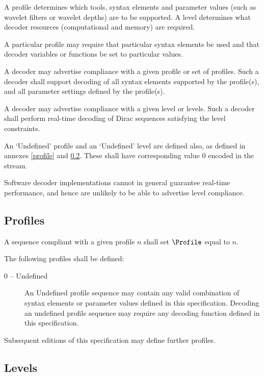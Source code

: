 \label{profilelevel}

A profile determines which tools, syntax elements and parameter values (such as wavelet 
 filters or wavelet depths) are to be 
supported. A level determines what decoder resources (computational and memory)
 are required. 

A particular profile may require that particular syntax elements be used and that decoder
variables or functions be set to particular values. 

A decoder may advertise compliance with a given profile or set of profiles. 
Such a decoder shall support decoding of all syntax elements supported by the profile(s),
 and all parameter settings defined by the profile(s).

A decoder may advertise compliance with a given level or levels. Such a decoder shall
perform real-time decoding of Dirac sequences satisfying the level constraints.

An `Undefined' profile and an `Undefined' level are defined also, as defined in annexes 
\ref{profile} and \ref{level}. These shall have corresponding value 0 encoded in the stream.

\begin{informative}
Software decoder implementations cannot in general guarantee real-time performance,
and hence are unlikely to be able to advertise level compliance.
\end{informative}

\subsection{Profiles}
\label{profiles}

A sequence compliant with a given profile $n$ shall set $\Profile$ equal to $n$.

The following profiles shall be defined:
\begin{description}
\item[0 -- Undefined] An Undefined profile sequence may contain any valid combination
of syntax elements or parameter values defined in this specification. Decoding an
undefined profile sequence may require any decoding function defined in this
 specification.
\end{description}

Subsequent editions of this specification may define further profiles.

\subsection{Levels}
\label{level}

